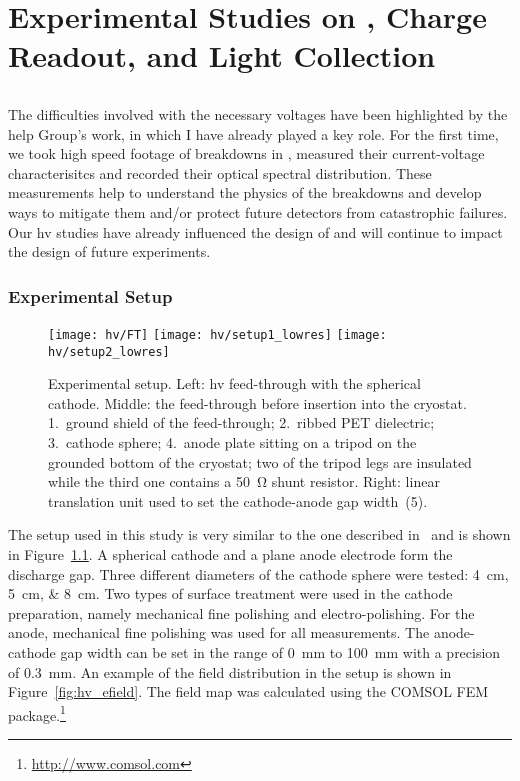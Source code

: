 \chapter{Experimental Studies on , Charge Readout, and Light Collection}
\label{chap:studies}


\section{}
\label{sec:studies_hv}

The difficulties involved with the necessary voltages have been highlighted by the \gls{help} Group’s work, in which I have already played a key role\cite{breakdown_16}.
For the first time, we took high speed footage of breakdowns in \lar{}, measured their current-voltage characterisitcs and recorded their optical spectral distribution.
These measurements help to understand the physics of the breakdowns and develop ways to mitigate them and/or protect future detectors from catastrophic failures.
Our \gls{hv} studies have already influenced the design of \uboone{} and will continue to impact the design of future experiments.


\subsection{Experimental Setup}
\label{sec:studies_hv_setup}

\begin{figure}[htb]
	\centering	
	\texttt{[image: hv/FT]}
	\texttt{[image: hv/setup1\_lowres]}
	\texttt{[image: hv/setup2\_lowres]}
	\caption{Experimental setup. Left: \gls{hv} feed-through with the spherical cathode. Middle: the feed-through before insertion into the cryostat. 1.~ground shield of the feed-through; 2.~ribbed PET dielectric; 3.~cathode sphere; 4.~anode plate sitting on a tripod on the grounded bottom of the cryostat; two of the tripod legs are insulated while the third one contains a \SI{50}{\ohm} shunt resistor. Right: linear translation unit used to set the cathode-anode gap width~(5).}
	\label{fig:hv_setup1}
\end{figure}

The setup used in this study is very similar to the one described in~\cite{breakdown_14} and is shown in Figure~\ref{fig:hv_setup1}.
A spherical cathode and a plane anode electrode form the discharge gap.
Three different diameters of the cathode sphere were tested: \SIlist{4; 5; 8}{\centi\metre}.
Two types of surface treatment were used in the cathode preparation, namely mechanical fine polishing and electro-polishing.
For the anode, mechanical fine polishing was used for all measurements.
The anode-cathode gap width can be set in the range of \SI{0}{\milli\metre} to \SI{100}{\milli\metre} with a precision of \SI{0.3}{\milli\metre}.
An example of the field distribution in the setup is shown in Figure~\ref{fig:hv_efield}.
The field map was calculated using the COMSOL FEM package.\footnote{\url{http://www.comsol.com}}

